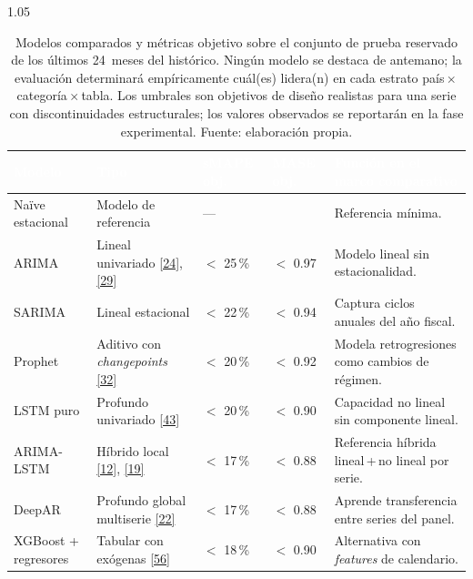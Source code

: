 \documentclass[12pt,letterpaper]{report}
\newcommand{\cita}[1]{\hyperref[bib:#1]{[#1]}}
\begin{document}
\begin{table}[H]
    \centering
    \begin{spacing}{1.05}
    \footnotesize
    \setlength{\arrayrulewidth}{0.7pt}
    \setlength{\tabcolsep}{4pt}
    \begin{tabular}{>{\raggedright\arraybackslash}p{3.4cm}
                    >{\raggedright\arraybackslash}p{3.4cm}
                    >{\centering\arraybackslash}p{1.4cm}
                    >{\centering\arraybackslash}p{1.4cm}
                    >{\raggedright\arraybackslash}p{3.0cm}}
        \hline
        \rowcolor{uacjblue!85}
        \textcolor{white}{\textbf{Modelo}} &
        \textcolor{white}{\textbf{Tipo}} &
        \textcolor{white}{\textbf{sMAPE obj.}} &
        \textcolor{white}{\textbf{MASE obj.}} &
        \textcolor{white}{\textbf{Función en el marco comparativo}} \\
        \hline
        \rowcolor{uacjblue!4}
        Naïve estacional & Modelo de referencia & --- & 1.00 & Referencia mínima. \\
        ARIMA & Lineal univariado \cita{24}, \cita{29} & $<$ 25\,\% & $<$ 0.97 & Modelo lineal sin estacionalidad. \\
        \rowcolor{uacjblue!4}
        SARIMA & Lineal estacional & $<$ 22\,\% & $<$ 0.94 & Captura ciclos anuales del año fiscal. \\
        Prophet & Aditivo con \textit{changepoints} \cita{32} & $<$ 20\,\% & $<$ 0.92 & Modela retrogresiones como cambios de régimen. \\
        \rowcolor{uacjblue!4}
        LSTM puro & Profundo univariado \cita{43} & $<$ 20\,\% & $<$ 0.90 & Capacidad no lineal sin componente lineal. \\
        ARIMA-LSTM & Híbrido local \cita{12}, \cita{19} & $<$ 17\,\% & $<$ 0.88 & Referencia híbrida lineal\,+\,no lineal por serie. \\
        \rowcolor{uacjblue!4}
        DeepAR & Profundo global multiserie \cita{22} & $<$ 17\,\% & $<$ 0.88 & Aprende transferencia entre series del panel. \\
        XGBoost + regresores & Tabular con exógenas \cita{56} & $<$ 18\,\% & $<$ 0.90 & Alternativa con \textit{features} de calendario. \\
        \hline
    \end{tabular}
    \end{spacing}
    \caption[Modelos comparados y métricas objetivo.]{Modelos comparados y métricas objetivo sobre el conjunto de prueba reservado de los últimos 24~meses del histórico. Ningún modelo se destaca de antemano; la evaluación determinará empíricamente cuál(es) lidera(n) en cada estrato país\,$\times$\,categoría\,$\times$\,tabla. Los umbrales son objetivos de diseño realistas para una serie con discontinuidades estructurales; los valores observados se reportarán en la fase experimental. Fuente: elaboración propia.}
    \label{tab:modelos_referencia}
\end{table}
\end{document}
